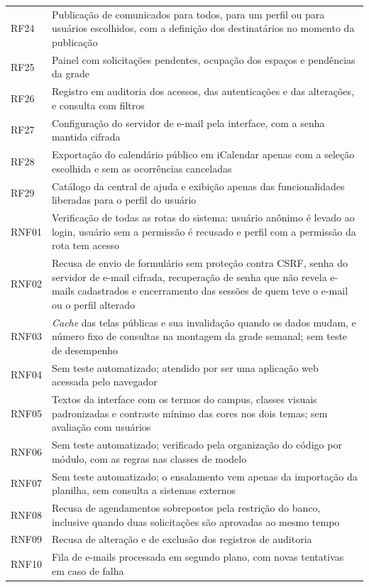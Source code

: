 \begin{apendicesenv}
\begin{SingleSpace}
\begin{longtable}{@{}>{\raggedright\arraybackslash}p{1.9cm}>{\raggedright\arraybackslash}p{12.6cm}@{}}
	RF24 & Publicação de comunicados para todos, para um perfil ou para usuários escolhidos, com a definição dos destinatários no momento da publicação \\
	RF25 & Painel com solicitações pendentes, ocupação dos espaços e pendências da grade \\
	RF26 & Registro em auditoria dos acessos, das autenticações e das alterações, e consulta com filtros \\
	RF27 & Configuração do servidor de e-mail pela interface, com a senha mantida cifrada \\
	RF28 & Exportação do calendário público em iCalendar apenas com a seleção escolhida e sem as ocorrências canceladas \\
	RF29 & Catálogo da central de ajuda e exibição apenas das funcionalidades liberadas para o perfil do usuário \\
	RNF01 & Verificação de todas as rotas do sistema: usuário anônimo é levado ao login, usuário sem a permissão é recusado e perfil com a permissão da rota tem acesso \\
	RNF02 & Recusa de envio de formulário sem proteção contra CSRF, senha do servidor de e-mail cifrada, recuperação de senha que não revela e-mails cadastrados e encerramento das sessões de quem teve o e-mail ou o perfil alterado \\
	RNF03 & \textit{Cache} das telas públicas e sua invalidação quando os dados mudam, e número fixo de consultas na montagem da grade semanal; sem teste de desempenho \\
	RNF04 & Sem teste automatizado; atendido por ser uma aplicação web acessada pelo navegador \\
	RNF05 & Textos da interface com os termos do campus, classes visuais padronizadas e contraste mínimo das cores nos dois temas; sem avaliação com usuários \\
	RNF06 & Sem teste automatizado; verificado pela organização do código por módulo, com as regras nas classes de modelo \\
	RNF07 & Sem teste automatizado; o ensalamento vem apenas da importação da planilha, sem consulta a sistemas externos \\
	RNF08 & Recusa de agendamentos sobrepostos pela restrição do banco, inclusive quando duas solicitações são aprovadas ao mesmo tempo \\
	RNF09 & Recusa de alteração e de exclusão dos registros de auditoria \\
	RNF10 & Fila de e-mails processada em segundo plano, com novas tentativas em caso de falha \\

\end{longtable}
\end{SingleSpace}
\end{apendicesenv}
